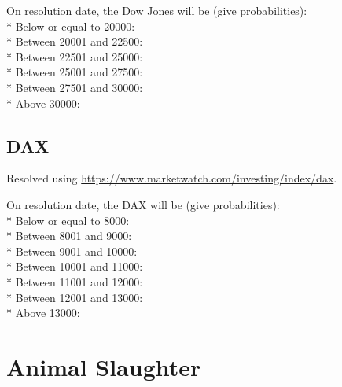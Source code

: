 \documentclass{article}
\begin{document}
On resolution date, the Dow Jones will be (give probabilities):\\*
Below or equal to 20000: \null\hfill\underline{\hspace{5cm}}\\*
Between 20001 and 22500: \null\hfill\underline{\hspace{5cm}}\\*
Between 22501 and 25000: \null\hfill\underline{\hspace{5cm}}\\*
Between 25001 and 27500: \null\hfill\underline{\hspace{5cm}}\\*
Between 27501 and 30000: \null\hfill\underline{\hspace{5cm}}\\*
Above 30000: \null\hfill\underline{\hspace{5cm}}

\subsection*{DAX}

Resolved using
\href{https://www.marketwatch.com/investing/index/dax}{https://www.marketwatch.com/investing/index/dax}.

\vspace{0.3cm}

On resolution date, the DAX will be (give probabilities):\\*
Below or equal to 8000: \null\hfill\underline{\hspace{5cm}}\\*
Between 8001 and 9000: \null\hfill\underline{\hspace{5cm}}\\*
Between 9001 and 10000: \null\hfill\underline{\hspace{5cm}}\\*
Between 10001 and 11000: \null\hfill\underline{\hspace{5cm}}\\*
Between 11001 and 12000: \null\hfill\underline{\hspace{5cm}}\\*
Between 12001 and 13000: \null\hfill\underline{\hspace{5cm}}\\*
Above 13000: \null\hfill\underline{\hspace{5cm}}

\section*{Animal Slaughter}
\end{document}
